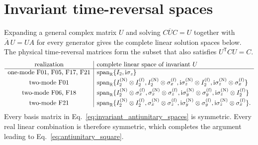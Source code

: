 \documentclass[onecolumn,aps,prb,amsmath,amssymb,superscriptaddress,longbibliography]{revtex4-2}
\newcommand{\ii}{\mathrm{i}}
\newcommand{\trans}{\mathsf{T}}
\begin{document}
\section{Invariant time-reversal spaces}
\label{app:antiunitary_spaces}

Expanding a general complex matrix \(U\) and solving
\(C\overline U C=U\) together with
\(\overline A\,U=UA\) for every generator gives the complete linear solution
spaces below.  The physical time-reversal matrices form the subset that also
satisfies \(U^\trans C U=C\).
\begin{equation}
\begin{array}{c|l}
\text{realization} & \text{complete linear space of invariant }U \\ \hline
\text{one-mode F01, F05, F17, F21}
&\operatorname{span}_{\mathbb R}\{I_2,\ii\sigma_z\}\\[2pt]
\text{two-mode F01}
&\operatorname{span}_{\mathbb R}
\{I_2^{({\rm N})}\otimes I_2^{({\rm f})},
I_2^{({\rm N})}\otimes\sigma_x^{({\rm f})},
\ii\sigma_z^{({\rm N})}\otimes I_2^{({\rm f})},
\ii\sigma_z^{({\rm N})}\otimes\sigma_x^{({\rm f})}\}\\[2pt]
\text{two-mode F06, F18}
&\operatorname{span}_{\mathbb R}
\{I_2^{({\rm N})}\otimes\sigma_x^{({\rm f})},
\sigma_x^{({\rm N})}\otimes\sigma_z^{({\rm f})},
\ii\sigma_y^{({\rm N})}\otimes\sigma_y^{({\rm f})},
\ii\sigma_z^{({\rm N})}\otimes I_2^{({\rm f})}\}\\[2pt]
\text{two-mode F21}
&\operatorname{span}_{\mathbb R}
\{I_2^{({\rm N})}\otimes I_2^{({\rm f})},
\sigma_x^{({\rm N})}\otimes\sigma_z^{({\rm f})},
\ii\sigma_y^{({\rm N})}\otimes\sigma_y^{({\rm f})},
\ii\sigma_z^{({\rm N})}\otimes\sigma_x^{({\rm f})}\}.
\end{array}
    \label{eq:invariant_antiunitary_spaces}
\end{equation}
Every basis matrix in Eq.~\eqref{eq:invariant_antiunitary_spaces} is symmetric.
Every real linear combination is therefore symmetric, which completes the
argument leading to Eq.~\eqref{eq:antiunitary_square}.


\end{document}
